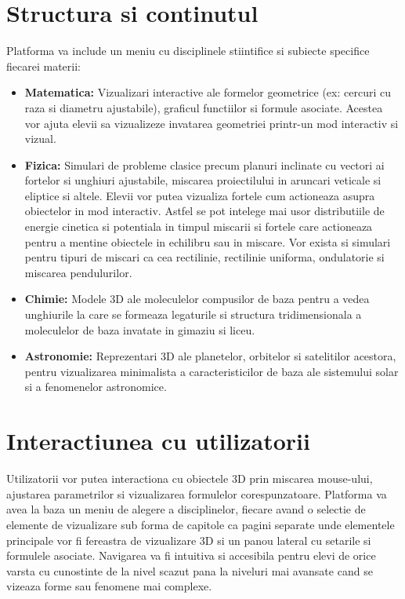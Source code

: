 \documentclass[a4paper,12pt]{article}
\begin{document}
\section*{Structura si continutul}
Platforma va include un meniu cu disciplinele stiintifice si subiecte specifice fiecarei materii:
\begin{itemize}
    \item \textbf{Matematica:} Vizualizari interactive ale formelor geometrice 
    (ex: cercuri cu raza si diametru ajustabile), graficul functiilor si formule asociate.
    Acestea vor ajuta elevii sa vizualizeze invatarea geometriei printr-un mod interactiv si vizual.
    \item \textbf{Fizica:} Simulari de probleme clasice precum planuri inclinate cu vectori
    ai fortelor si unghiuri ajustabile, miscarea proiectilului in aruncari veticale si eliptice si altele.
    Elevii vor putea vizualiza fortele cum actioneaza asupra obiectelor in mod interactiv. 
    Astfel se pot intelege mai usor distributiile de energie cinetica si potentiala in timpul miscarii
    si fortele care actioneaza pentru a mentine obiectele in echilibru sau in miscare. Vor exista
    si simulari pentru tipuri de miscari ca cea rectilinie, rectilinie uniforma, ondulatorie si miscarea
    pendulurilor.
    \item \textbf{Chimie:} Modele 3D ale moleculelor compusilor de baza pentru a vedea unghiurile
    la care se formeaza legaturile si structura tridimensionala a moleculelor de baza invatate in gimaziu
    si liceu.
    \item \textbf{Astronomie:} Reprezentari 3D ale planetelor, orbitelor si satelitilor acestora,
    pentru vizualizarea minimalista a caracteristicilor de baza ale sistemului solar si a fenomenelor
    astronomice.
\end{itemize}

\section*{Interactiunea cu utilizatorii}
Utilizatorii vor putea interactiona cu obiectele 3D prin miscarea mouse-ului, ajustarea parametrilor
si vizualizarea formulelor corespunzatoare. 
Platforma va avea la baza un meniu de alegere a disciplinelor, fiecare avand o selectie de elemente
de vizualizare sub forma de capitole ca pagini separate unde elementele principale vor fi fereastra
de vizualizare 3D si un panou lateral cu setarile si formulele asociate.
Navigarea va fi intuitiva si accesibila pentru elevi de orice varsta cu cunostinte de la nivel scazut
pana la niveluri mai avansate cand se vizeaza forme sau fenomene mai complexe.
\end{document}
